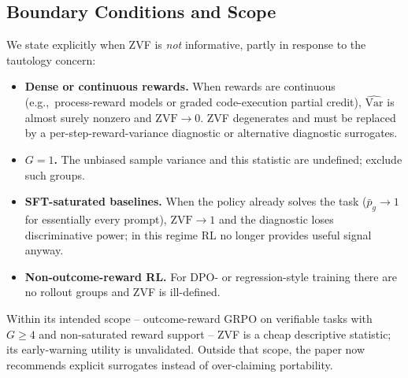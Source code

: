 \subsection{Boundary Conditions and Scope}

We state explicitly when ZVF is \emph{not} informative, partly in response
to the tautology concern:
\begin{itemize}[leftmargin=1.2em,itemsep=0pt]
  \item \textbf{Dense or continuous rewards.} When rewards are continuous
        (e.g.,~process-reward models or graded code-execution partial credit),
        $\widehat{\mathrm{Var}}$ is almost surely nonzero and
        $\mathrm{ZVF} \to 0$. ZVF degenerates and must be replaced by a
        per-step-reward-variance diagnostic or alternative diagnostic surrogates.
  \item \textbf{$G=1$.} The unbiased sample variance and this statistic are undefined; exclude such groups.
  \item \textbf{SFT-saturated baselines.} When the policy already solves
        the task ($\bar p_g \to 1$ for essentially every prompt),
        $\mathrm{ZVF} \to 1$ and the diagnostic loses discriminative power;
        in this regime RL no longer provides useful signal anyway.
  \item \textbf{Non-outcome-reward RL.} For DPO- or regression-style
        training there are no rollout groups and ZVF is ill-defined.
\end{itemize}
Within its intended scope -- outcome-reward GRPO on verifiable tasks with
$G \ge 4$ and non-saturated reward support -- ZVF is a cheap descriptive statistic; its early-warning utility is unvalidated. Outside that scope, the paper now recommends
explicit surrogates instead of over-claiming portability.
